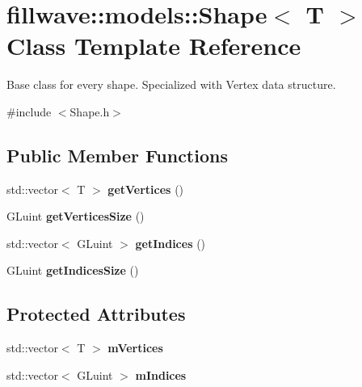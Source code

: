 \hypertarget{classfillwave_1_1models_1_1Shape}{}\section{fillwave\+:\+:models\+:\+:Shape$<$ T $>$ Class Template Reference}
\label{classfillwave_1_1models_1_1Shape}


Base class for every shape. Specialized with Vertex data structure.  




{\ttfamily \#include $<$Shape.\+h$>$}

\subsection*{Public Member Functions}
\begin{DoxyCompactItemize}
\item 
\hypertarget{classfillwave_1_1models_1_1Shape_a058aaa6f995adfa24cd0d80add34375c}{}std\+::vector$<$ T $>$ {\bfseries get\+Vertices} ()\label{classfillwave_1_1models_1_1Shape_a058aaa6f995adfa24cd0d80add34375c}

\item 
\hypertarget{classfillwave_1_1models_1_1Shape_ae05419ecb687ec21e965ae3a476d88e8}{}G\+Luint {\bfseries get\+Vertices\+Size} ()\label{classfillwave_1_1models_1_1Shape_ae05419ecb687ec21e965ae3a476d88e8}

\item 
\hypertarget{classfillwave_1_1models_1_1Shape_a5764960ba8289405f95d3bf6e962a508}{}std\+::vector$<$ G\+Luint $>$ {\bfseries get\+Indices} ()\label{classfillwave_1_1models_1_1Shape_a5764960ba8289405f95d3bf6e962a508}

\item 
\hypertarget{classfillwave_1_1models_1_1Shape_ad644160006559ec931c373e4e000d421}{}G\+Luint {\bfseries get\+Indices\+Size} ()\label{classfillwave_1_1models_1_1Shape_ad644160006559ec931c373e4e000d421}

\end{DoxyCompactItemize}
\subsection*{Protected Attributes}
\begin{DoxyCompactItemize}
\item 
\hypertarget{classfillwave_1_1models_1_1Shape_a5ae326c6b1f4c11fec916a4d2c459a0d}{}std\+::vector$<$ T $>$ {\bfseries m\+Vertices}\label{classfillwave_1_1models_1_1Shape_a5ae326c6b1f4c11fec916a4d2c459a0d}

\item 
\hypertarget{classfillwave_1_1models_1_1Shape_a19c872cadada9a45eb3e29eb1262fcfd}{}std\+::vector$<$ G\+Luint $>$ {\bfseries m\+Indices}\label{classfillwave_1_1models_1_1Shape_a19c872cadada9a45eb3e29eb1262fcfd}

\end{DoxyCompactItemize}


